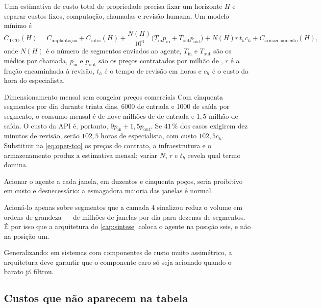 Uma estimativa de custo total de propriedade precisa fixar um horizonte $H$ e separar
custos fixos, computação, chamadas e revisão humana. Um modelo mínimo é
\begin{equation}
      C_{\mathrm{TCO}}(H) = C_{\mathrm{implantação}} + C_{\mathrm{infra}}(H)
      + \frac{N(H)}{10^6}\bigl(T_{\mathrm{in}}p_{\mathrm{in}}
      + T_{\mathrm{out}}p_{\mathrm{out}}\bigr)
      + N(H)r\,t_h c_h + C_{\mathrm{armazenamento}}(H),
      \label{eq:oper-tco}
\end{equation}
onde $N(H)$ é o número de segmentos enviados ao agente, $T_{\mathrm{in}}$ e
$T_{\mathrm{out}}$ são os  médios por chamada, $p_{\mathrm{in}}$ e
$p_{\mathrm{out}}$ são os preços contratados por milhão de , $r$ é a
fração encaminhada à revisão, $t_h$ é o tempo de revisão em horas e $c_h$ é o custo da
hora do especialista.

\begin{exemplo}{Dimensionamento mensal sem congelar preços comerciais}
Com cinquenta segmentos por dia durante trinta dias, \num{6000}  de entrada
e \num{1000} de saída por segmento, o consumo mensal é de nove milhões de 
de entrada e $1{,}5$ milhão de saída. O custo da API é, portanto,
$9p_{\mathrm{in}}+1{,}5p_{\mathrm{out}}$. Se $41\,\%$ dos casos exigirem dez minutos de
revisão, serão $102{,}5$ horas de especialista, com custo $102{,}5c_h$. Substituir na
\cref{eq:oper-tco} os preços do contrato, a infraestrutura e o armazenamento produz a
estimativa mensal; variar $N$, $r$ e $t_h$ revela qual termo domina.
\end{exemplo}

\begin{destaque}
Acionar o agente a cada janela, em duzentos e cinquenta poços, seria proibitivo em custo
e desnecessário: a esmagadora maioria das janelas é normal.

Acioná-lo apenas sobre segmentos que a camada 4 sinalizou reduz o volume em ordens de
grandeza --- de milhões de janelas por dia para dezenas de segmentos. É por isso que a
arquitetura do \cref{cap:sintese} coloca o agente na posição seis, e não na posição um.

Generalizando: em sistemas com componentes de custo muito assimétrico, a arquitetura
deve garantir que o componente caro só seja acionado quando o barato já filtrou.
\end{destaque}

\subsection{Custos que não aparecem na tabela}

